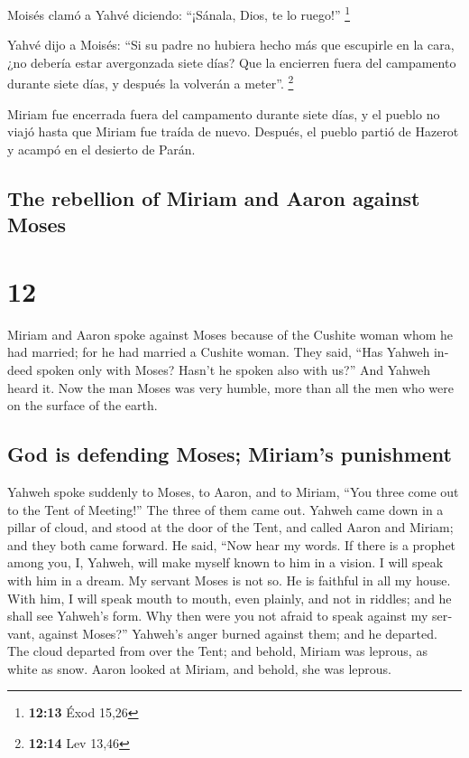 \begin{paracol}{2}
 Moisés clamó a Yahvé diciendo: ``¡Sánala, Dios, te lo
ruego!'' \footnote{\textbf{12:13} Éxod 15,26}

 Yahvé dijo a Moisés: ``Si su padre no hubiera hecho más
que escupirle en la cara, ¿no debería estar avergonzada siete días? Que
la encierren fuera del campamento durante siete días, y después la
volverán a meter''. \footnote{\textbf{12:14} Lev 13,46}

 Miriam fue encerrada fuera del campamento durante siete
días, y el pueblo no viajó hasta que Miriam fue traída de nuevo.
 Después, el pueblo partió de Hazerot y acampó en el
desierto de Parán.

\switchcolumn
\begin{otherlanguage}{english}

\hypertarget{the-rebellion-of-miriam-and-aaron-against-moses}{%
\subsection{The rebellion of Miriam and Aaron against
Moses}\label{the-rebellion-of-miriam-and-aaron-against-moses}}

\hypertarget{section-23}{%
\section{12}\label{section-23}}

 Miriam and Aaron spoke against Moses because of the
Cushite woman whom he had married; for he had married a Cushite woman.
 They said, ``Has Yahweh indeed spoken only with Moses?
Hasn't he spoken also with us?'' And Yahweh heard it.  Now
the man Moses was very humble, more than all the men who were on the
surface of the earth.

\hypertarget{god-is-defending-moses-miriams-punishment}{%
\subsection{God is defending Moses; Miriam's
punishment}\label{god-is-defending-moses-miriams-punishment}}

 Yahweh spoke suddenly to Moses, to Aaron, and to Miriam,
``You three come out to the Tent of Meeting!'' The three of them came
out.  Yahweh came down in a pillar of cloud, and stood at
the door of the Tent, and called Aaron and Miriam; and they both came
forward.  He said, ``Now hear my words. If there is a
prophet among you, I, Yahweh, will make myself known to him in a vision.
I will speak with him in a dream.  My servant Moses is not
so. He is faithful in all my house.  With him, I will
speak mouth to mouth, even plainly, and not in riddles; and he shall see
Yahweh's form. Why then were you not afraid to speak against my servant,
against Moses?''  Yahweh's anger burned against them; and
he departed.  The cloud departed from over the Tent; and
behold, Miriam was leprous, as white as snow. Aaron looked at Miriam,
and behold, she was leprous.


\end{otherlanguage}
\end{paracol}

